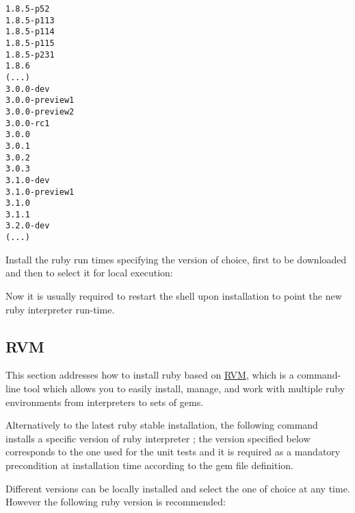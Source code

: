 \documentclass[dec_sum_main.tex]{subfiles}
\begin{document}
\begin{Verbatim}
1.8.5-p52
1.8.5-p113
1.8.5-p114
1.8.5-p115
1.8.5-p231
1.8.6
(...)
3.0.0-dev
3.0.0-preview1
3.0.0-preview2
3.0.0-rc1
3.0.0
3.0.1
3.0.2
3.0.3
3.1.0-dev
3.1.0-preview1
3.1.0
3.1.1
3.2.0-dev
(...)
\end{Verbatim}


\par
\noindent
Install the ruby run times specifying the version of choice, first to be downloaded and then to select it for local execution:\newline

 \newline

\par
{}\newline

\par
\noindent
Now it is usually required to restart the shell upon  installation to point the new ruby interpreter run-time.

\subsection{RVM}
\par
\noindent
This section addresses how to install ruby based on \href{https://rvm.io/}{RVM}, which is a command-line tool which allows you to easily install, manage, and work with multiple ruby environments from interpreters to sets of gems. \newline

\par
{} \newline
\par 
\noindent
Alternatively to the latest ruby stable installation, the following command installs a specific version of ruby interpreter ; the version specified below corresponds to the one used for the unit tests and it is required as a mandatory precondition at installation time according to the gem file definition.\newline

\par 
\noindent
Different versions can be locally installed and select the one of choice at any time. However the following ruby version is recommended:
\end{document}
